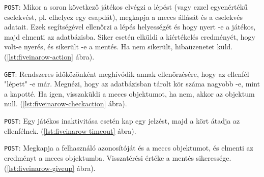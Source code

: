 


\texttt{POST}: Mikor a soron következő játékos elvégzi a lépést (vagy ezzel egyenértékű cselekvést, pl. elhelyez egy csapdát), megkapja a meccs állását és a cselekvés adatait. Ezek segítségével ellenőrzi a lépés helyességét és hogy nyert -e a játékos, majd elmenti az adatbázisba.
Siker esetén elküldi a kiértékelés eredményét, hogy volt-e nyerés, és sikerült -e a mentés. Ha nem sikerült, hibaüzenetet küld. (\ref{lst:fiveinarow-action} ábra).



\texttt{GET}: Rendszeres időközönként meghívódik annak ellenőrzésére, hogy az ellenfél "lépett" -e már. Megnézi, hogy az adatbázisban tárolt kör száma nagyobb -e, mint a kapotté. Ha igen, visszaküldi a meccs objektumot, ha nem, akkor az objektum null. (\ref{lst:fiveinarow-checkaction} ábra).



\texttt{POST}: Egy játékos inaktivitása esetén kap egy jelzést, majd a kört átadja az ellenfélnek. (\ref{lst:fiveinarow-timeout} ábra).



\texttt{POST}: Megkapja a felhasználó azonosítóját és a meccs objektumot, és elmenti az eredményt a meccs objektumba. Visszatérési értéke a mentés sikeressége. (\ref{lst:fiveinarow-giveup} ábra).











